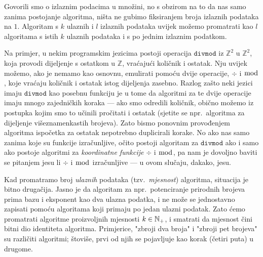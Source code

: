 
\begin{napomena}[{name=[samo jedan izlazni podatak]}]\label{nap:brip}
Govorili smo o izlaznim podacima u množini, no s obzirom na to da nas samo zanima postojanje algoritma, ništa ne gubimo fiksiranjem broja izlaznih podataka na $1$. Algoritam s $k$ ulaznih i $l$ izlaznih podataka uvijek možemo promatrati kao $l$ algoritama s istih $k$ ulaznih podataka i s po jednim izlaznim podatkom.

    Na primjer, u nekim programskim jezicima postoji operacija $\texttt{divmod}$ iz $\mathbb Z^2$ u $\mathbb Z^2$, koja provodi dijeljenje s ostatkom u $\mathbb Z$, vraćajući količnik i ostatak. Nju uvijek možemo, ako je nemamo kao osnovnu, emulirati pomoću dvije operacije, $\div$ i $\bmod$, koje vraćaju količnik i ostatak istog dijeljenja zasebno. Razlog zašto neki jezici imaju $\texttt{divmod}$ kao posebnu funkciju je u tome da algoritmi za te dvije operacije imaju mnogo zajedničkih koraka --- ako smo odredili količnik, obično možemo iz postupka kojim smo to učinili pročitati i ostatak (sjetite se npr.\ algoritma za dijeljenje višeznamenkastih brojeva). Zato bismo ponovnim provođenjem algoritma ispočetka za ostatak nepotrebno duplicirali korake. No ako nas samo zanima koje su funkcije izračunljive, očito postoji algoritam za $\texttt{divmod}$ ako i samo ako postoje algoritmi za \emph{koordinatne funkcije} $\div$ i $\bmod$, pa nam je dovoljno baviti se pitanjem jesu li $\div$ i $\bmod$ izračunljive --- u ovom slučaju, dakako, jesu.
\end{napomena}

Kad promatramo broj \emph{ulaznih} podataka (tzv\!.\ \emph{mjesnost}) algoritma, situacija je bitno drugačija. Jasno je da algoritam za npr.\ potenciranje prirodnih brojeva prima bazu i eksponent kao dva ulazna podatka, i ne može se jednostavno zapisati pomoću algoritama koji primaju po jedan ulazni podatak. %
Zato ćemo promatrati algoritme proizvoljnih mjesnosti $k\in{\mathbb N}_+$, i smatrati da mjesnost čini bitni dio identiteta algoritma. Primjerice, "zbroji dva broja" i "zbroji pet brojeva" su različiti algoritmi; štoviše, prvi od njih se pojavljuje kao korak (četiri puta) u drugome.

